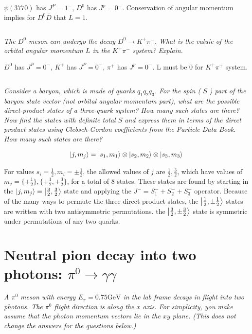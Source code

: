 \documentclass{article}
\begin{document}
$\psi(3770)$ has $ J^{P}=1^-$, $ D^{0}$ has $ J^{p}=0^-$. Conservation of angular momentum implies for $D^{0} \bar{D}$ that $L=1$.


\subsection{}
\textit{The $D^{0}$ meson can undergo the decay $D^{0} \rightarrow K^{+} \pi^{-}$. What is the valuie of the orbital angular momentum $L$ in the $K^{+} \pi^{-}$ system? Explain.}

$D^{0}$ has $J^{P}=0^{-}$, $K^{+}$ has $J^{P}=0^{-}$, $\pi^{+}$ has $J^{p}=0^{-}$. L must be 0 for $K^{+} \pi^{+}$ system.


\subsection{}
\textit{Consider a baryon, which is made of quarks $q_{1} q_{2} q_{3}$. For the spin ( $S$ ) part of the baryon state vector (not orbital angular momentum part), what are the possible direct-product states of a three-quark system? How many such states are there? Now find the states with definite total $S$ and express them in terms of the direct product states using Clebsch-Gordon coefficients from the Particle Data Book. How many such states are there?}

$$ \ket{j, m_j} = \ket{s_1, m_1}\otimes \ket{s_2, m_2}\otimes \ket{s_3, m_3}$$

For values $s_i = \frac{1}{2}, m_i = \pm \frac{1}{2}$, the allowed values of $j$ are $\frac{1}{2},\frac{3}{2}$, which have values of $m_j = \{\pm \frac{1}{2}\},\{\pm \frac{1}{2}, \pm \frac{3}{2}\}$, for a total of 8 states. These states are found by starting in the $\ket{j, m_j} = \ket{\frac{3}{2}, \frac{3}{2}}$ state and applying the $J^- = S_1^-+S_2^-+S_3^-$ operator. Because of the many ways to permute the three direct product states, the $\ket{\frac{1}{2}, \pm \frac{1}{2}}$ states are written with two antisymmetric permutations. the $\ket{\frac{3}{2}, \pm \frac{3}{2}}$ state is symmetric under permutations of any two quarks. 

\newpage

\section{Neutral pion decay into two photons: $\pi^{0} \rightarrow \gamma \gamma$}
\textit{A $\pi^{0}$ meson with energy $E_{\pi}=0.75 \mathrm{GeV}$ in the lab frame decays in flight into two photons. The $\pi^{0}$ flight direction is along the $x$ axis. For simplicity, you make assume that the photon momentum vectors lie in the $x y$ plane. (This does not change the answers for the questions below.)}
\end{document}
